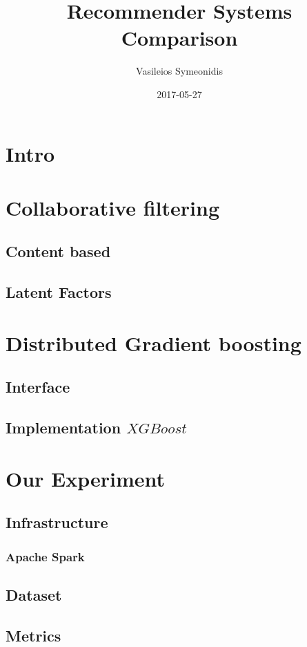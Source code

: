 \documentclass{article}
\title{Recommender Systems Comparison}
\date{2017-05-27}
\author{Vasileios Symeonidis}
\begin{document}
\maketitle
\newpage
\tableofcontents
{}
\newpage
{}

\section{Intro}

\section{Collaborative filtering}
\subsection{Content based}
\subsection{Latent Factors}

\section{Distributed Gradient boosting}
\subsection{Interface}
\subsection{Implementation \(XGBoost\)}

\section{Our Experiment}
\subsection{Infrastructure}
\subsubsection{Apache Spark}
\subsection{Dataset}
\subsection{Metrics}
\end{document}

